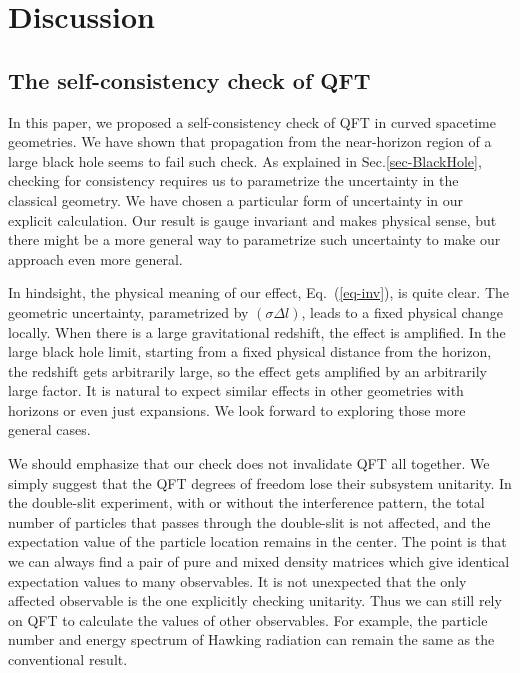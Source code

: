 \documentclass[aps,showpacs,onecolumn,floats,prd,superscriptaddress,nofootinbib]{revtex4-1}
\begin{document}
\section{Discussion}
\label{sec-dis}

\subsection{The self-consistency check of QFT}

In this paper, we proposed a self-consistency check of QFT in curved spacetime geometries.
We have shown that propagation from the near-horizon region of a large black hole seems to fail such check.
As explained in Sec.\ref{sec-BlackHole}, checking for consistency requires us to parametrize the uncertainty in the classical geometry.
We have chosen a particular form of uncertainty in our explicit calculation.
Our result is gauge invariant and makes physical sense, but there might be a more general way to parametrize such uncertainty to make our approach even more general.

In hindsight, the physical meaning of our effect, Eq.~(\ref{eq-inv}), is quite clear.
The geometric uncertainty, parametrized by $(\sigma\Delta l)$, leads to a fixed physical change locally.
When there is a large gravitational redshift, the effect is amplified.
In the large black hole limit, starting from a fixed physical distance from the horizon, the redshift gets arbitrarily large, so the effect gets amplified by an arbitrarily large factor.
It is natural to expect similar effects in other geometries with horizons or even just expansions.
We look forward to exploring those more general cases.

We should emphasize that our check does not invalidate QFT all together.
We simply suggest that the QFT degrees of freedom lose their subsystem unitarity.
In the double-slit experiment, with or without the interference pattern, the total number of particles that passes through the double-slit is not affected, and the expectation value of the particle location remains in the center.
The point is that we can always find a pair of pure and mixed density matrices which give identical expectation values to many observables.
It is not unexpected that the only affected observable is the one explicitly checking unitarity.
Thus we can still rely on QFT to calculate the values of other observables.
For example, the particle number and energy spectrum of Hawking radiation can remain the same as the conventional result.
\end{document}
